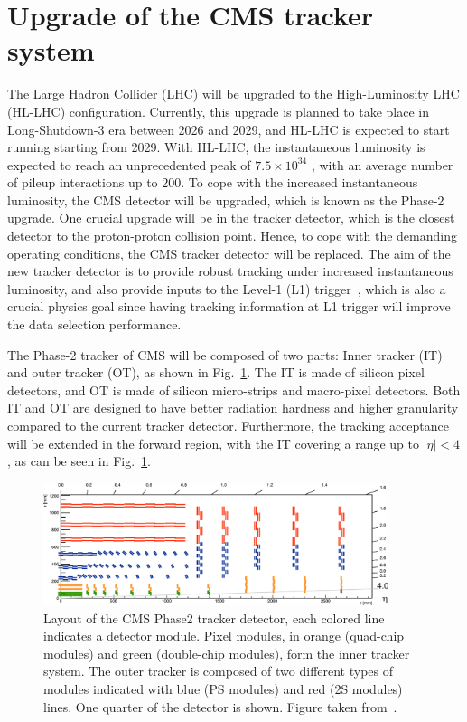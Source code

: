 \section{Upgrade of the CMS tracker system}

\graphicspath{{5_Outlook/Figures}}

The Large Hadron Collider (LHC) will be upgraded to the High-Luminosity LHC (HL-LHC) configuration. Currently,
this upgrade is planned to take place in Long-Shutdown-3 era between 2026 and 2029, and HL-LHC is expected to 
start running starting from 2029.
With HL-LHC, the instantaneous luminosity is expected to reach an unprecedented peak of
$7.5 \times 10^{34}$ \lumiunit, with an average number of pileup interactions up to $200$. To cope with
the increased instantaneous luminosity, the CMS detector will be upgraded, which is known as the Phase-2 upgrade.
One crucial upgrade will be in the tracker detector, which is the closest detector to the proton-proton collision point. 
Hence, to cope with the demanding operating conditions, the CMS tracker detector will be replaced. The aim of the
new tracker detector is to provide robust tracking under increased instantaneous luminosity, and also provide inputs
to the Level-1 (L1) trigger~\cite{CMS:Phase2TrackerUpgrade}, which is also a crucial physics goal since having tracking
information at L1 trigger will improve the data selection performance.

The Phase-2 tracker of CMS will be composed of two parts:
Inner tracker (IT) and outer tracker (OT), as shown in Fig.~\ref{fig:phase2_tracker_layout}. 
The IT is made of silicon
pixel detectors, and OT is made of silicon micro-strips and macro-pixel detectors.
Both IT and OT are designed to have better radiation hardness and higher
granularity compared to the current tracker detector. Furthermore, the tracking acceptance will be extended
in the forward region, with the IT covering a range up to $|\eta| < 4$, as can be seen in 
Fig.~\ref{fig:phase2_tracker_layout}.

\begin{figure}[htbp]
    \centering
    \includegraphics[width=0.9\textwidth]{TrackerUpgrade/phase2_tracker_layout.jpeg}
    \caption{Layout of the CMS Phase2 tracker detector, each colored line indicates a detector module. 
    Pixel modules, in orange (quad-chip modules) and green (double-chip modules), form the inner tracker system. 
    The outer tracker is composed of two different types of modules indicated with blue (PS modules) and red (2S modules) lines. 
    One quarter of the detector is shown. Figure taken from~\cite{CMS:Phase2TrackerUpgrade}.}
    \label{fig:phase2_tracker_layout}
\end{figure}

